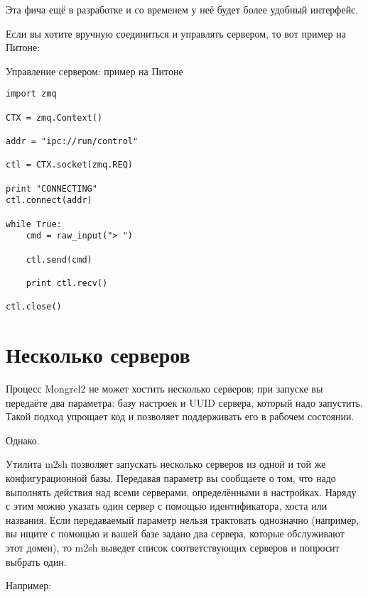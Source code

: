 Эта фича ещё в разработке и со временем у неё будет более удобный
интерфейс.

Если вы хотите вручную соединиться и управлять сервером, то вот пример
на Питоне:


\begin{code}{Управление сервером: пример на Питоне}
\begin{lstlisting}
import zmq

CTX = zmq.Context()

addr = "ipc://run/control"

ctl = CTX.socket(zmq.REQ)

print "CONNECTING"
ctl.connect(addr)

while True:
    cmd = raw_input("> ")

    ctl.send(cmd)

    print ctl.recv()

ctl.close()
\end{lstlisting}
\end{code}

\section{Несколько серверов}

Процесс Mongrel2 не может хостить несколько серверов; при запуске вы
передаёте два параметра: базу настроек и UUID сервера, который надо
запустить. Такой подход упрощает код и позволяет поддерживать его в
рабочем состоянии.

Однако.

Утилита m2sh позволяет запускать несколько серверов из одной и той же
конфигурационной базы. Передавая параметр  вы сообщаете
о том, что надо выполнять действия над всеми серверами, определёнными
в настройках. Наряду с этим можно указать один сервер с помощью
идентификатора, хоста или названия. Если передаваемый параметр нельзя
трактовать однозначно (например, вы ищите с помощью  и вашей базе задано два сервера, которые обслуживают этот
домен), то m2sh выведет список соответствующих серверов и попросит
выбрать один.

Например:

